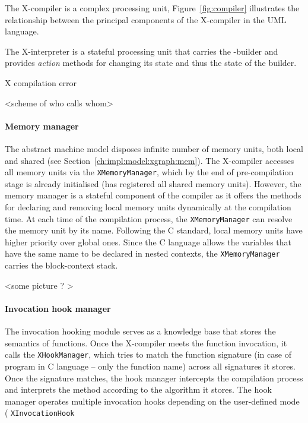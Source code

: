The X-compiler is a complex processing unit, Figure~\ref{fig:compiler} illustrates the relationship between the principal components of the X-compiler in the UML language.

The X-interpreter is a stateful processing unit that carries the \xgraph{}-builder and provides \textit{action} methods for changing its state and thus the state of the builder.


X compilation error

<scheme of who calls whom>



\paragraph{Memory manager}
\label{ch:impl:proc:x-compiler:mem}

The \xgraph{} abstract machine model disposes infinite number of memory units, both local and shared (see Section~\ref{ch:impl:model:xgraph:mem}).
The X-compiler accesses all memory units via the \texttt{XMemoryManager}, which by the end of pre-compilation stage is already initialised (has registered all shared memory units).
However, the memory manager is a stateful component of the compiler as it offers the methods for declaring and removing local memory units dynamically at the compilation time.
At each time of the compilation process, the \texttt{XMemoryManager} can resolve the memory unit by its name.
Following the C standard, local memory units have higher priority over global ones.
Since the C language allows the variables that have the same name to be declared in nested contexts, the \texttt{XMemoryManager} carries the block-context stack. %

<some picture ? >

\paragraph{Invocation hook manager}
\label{ch:impl:proc:x-compiler:hooking}


The invocation hooking module serves as a knowledge base that stores the semantics of functions.
Once the X-compiler meets the function invocation, it calls the \texttt{XHookManager}, which tries to match the function signature (in case of program in C language -- only the function name) across all signatures it stores.
Once the signature matches, the hook manager intercepts the compilation process and interprets the method according to the algorithm it stores.
The hook manager operates multiple invocation hooks depending on the user-defined mode (
 \texttt{XInvocationHook} 

